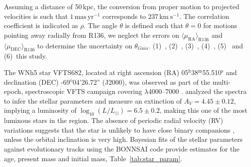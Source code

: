 \documentclass[a4paper,fleqn,usenatbib]{mnras}
\newcommand{\kms}{{\,\mathrm{km\ s^{-1}}}}
\newcommand{\masyr}{\,\mathrm{mas}\,\mathrm{yr}^{-1}}
\DeclareRobustCommand{\Tabref}[1]{Table~\ref{#1}}
\DeclareRobustCommand{\Secref}[1]{Sec.~\ref{#1}}
\begin{document}
\begin{table}
\begin{center}
\begin{tabular}{llc|c|c}
     



    \end{tabular}
    
    Assuming a distance of 50\,kpc, the conversion from proper motion
    to projected velocities is such that $1\masyr$ corresponds to $237\kms$.  The
      correlation coefficient is indicated as $\rho$. The angle
      $\theta$ is defined such that $\theta=0$ for motions pointing
      away radially from R136, we neglect the errors on
      $\langle\mu_\mathrm{RA}\rangle_\mathrm{R136}$ and $\langle\mu_\mathrm{DEC}\rangle_\mathrm{R136}$ to determine the uncertainty
      on $\theta_{Gaia}$.
      (1)~\cite{brown:18},
      (2)~\cite{henault-brunet:12},
      (3)~\cite{bestenlehner:11},
      (4)~\cite{lennon:18}, 
      (5)~\cite{platais:18} and
      (6)~{\color{blue}this study}.
  \end{center}
  \label{tab:vfts682}
\end{table}


The WNh5 star VFTS682, located at right ascension (RA)
05$^\mathrm{h}$38$^\mathrm{m}$55.510$^\mathrm{s}$  and declination
(DEC) \mbox{-69$^\mathrm{o}$04'26.72''} (J2000), was observed as part of the multi-epoch, spectroscopic VFTS campaign covering $\lambda$4000--7000 \citep[][]{evans:11}. 
\citet{bestenlehner:11}  analyzed the spectra to infer the stellar
parameters and measure an extinction of $A_V=4.45\pm0.12$, implying a
luminosity of $\log_{10}(L/L_\odot) =  6.5\pm0.2$, making this one of
the most luminous stars in the region. The absence of periodic radial
velocity (RV)
variations suggests that the star is unlikely to have close binary
companions \citep[][]{bestenlehner:11}, unless the orbital inclination is
very high. Bayesian fits of the stellar
parameters against evolutionary tracks \citep{brott:11, kohler:15}
using the BONNSAI code \citep{schneider:14,schneider:17} provide
estimates for the age, present mass and initial mass, %
\Tabref{tab:star_param}. %
\end{document}
